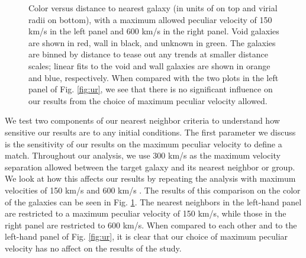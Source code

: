 \begin{figure}
    \caption[Sensitivity to peculiar velocity maximum]{Color versus distance to 
    nearest galaxy (in units of \hMpc on top and virial radii on bottom), with a 
    maximum allowed peculiar velocity of 150 km/s in the left panel and 600 km/s 
    in the right panel.  Void galaxies are shown in red, wall in black, and 
    unknown in green.  The galaxies are binned by distance to tease out any 
    trends at smaller distance scales; linear fits to the void and wall galaxies 
    are shown in orange and blue, respectively.  When compared with the two 
    plots in the left panel of Fig. \ref{fig:ur}, we see that there is no 
    significant influence on our results from the choice of maximum peculiar 
    velocity allowed.}
    \label{fig:ur_vpeculiar}
\end{figure}

We test two components of our nearest neighbor criteria to understand how 
sensitive our results are to any initial conditions.  The first parameter we 
discuss is the sensitivity of our results on the maximum peculiar velocity to 
define a match.  Throughout our analysis, we use 300 km/s as the maximum 
velocity separation allowed between the target galaxy and its nearest neighbor 
or group.  We look at how this affects our results by repeating the analysis 
with maximum velocities of 150 km/s and 600 km/s \citep[the criteria used in][]
{Hwang10,Guo11}.  The results of this comparison on the color of the galaxies 
can be seen in Fig. \ref{fig:ur_vpeculiar}.  The nearest neighbors in the 
left-hand panel are restricted to a maximum peculiar velocity of 150 km/s, while 
those in the right panel are restricted to 600 km/s.  When compared to each 
other and to the left-hand panel of Fig. \ref{fig:ur}, it is clear that our 
choice of maximum peculiar velocity has no affect on the results of the study.


